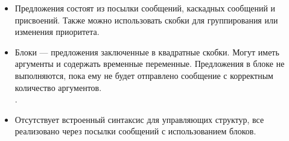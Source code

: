\documentclass[a4paper,10pt,twoside]{book}
\begin{document}
\begin{itemize}
\item 	Предложения состоят из посылки сообщений, каскадных сообщений и присвоений.
	Также можно использовать скобки для группирования или изменения приоритета.


\item	Блоки --- предложения заключенные в квадратные скобки.
	Могут иметь аргументы и содержать временные переменные.
	Предложения в блоке не выполняются, пока ему не будет отправлено сообщение  с корректным количество аргументов.\\
	.


\item	Отсутствует встроенный синтаксис для управляющих структур, все реализовано через посылки сообщений с использованием блоков.\\

\end{itemize}

\ifx\wholebook\relax\else
\end{document}
